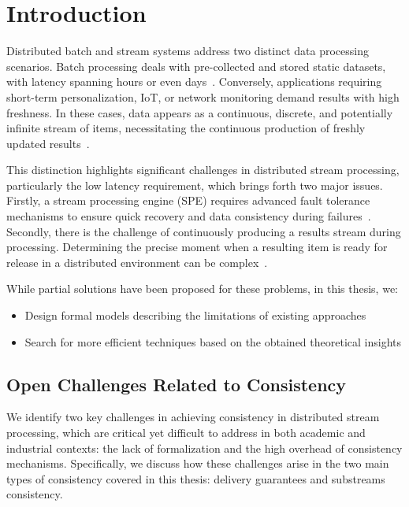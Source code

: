\chapter{Introduction}

Distributed batch and stream systems address two distinct data processing scenarios. Batch processing deals with pre-collected and stored static datasets, with latency spanning hours or even days~\cite{carbone2015apache, chang2014hawq, sun2023survey}. Conversely, applications requiring short-term personalization, IoT, or network monitoring demand results with high freshness. In these cases, data appears as a continuous, discrete, and potentially infinite stream of items, necessitating the continuous production of freshly updated results~\cite{fragkoulis2024survey, diro2024anomaly}.

This distinction highlights significant challenges in distributed stream processing, particularly the low latency requirement, which brings forth two major issues. Firstly, a stream processing engine (SPE) requires advanced fault tolerance mechanisms to ensure quick recovery and data consistency during failures~\cite{Wang:2019:LSF:3341301.3359653, akidau2015streaming}. Secondly, there is the challenge of continuously producing a results stream during processing. Determining the precise moment when a resulting item is ready for release in a distributed environment can be complex~\cite{Tucker:2003:EPS:776752.776780, DBLP:journals/pvldb/BegoliACHKKMS21}.

While partial solutions have been proposed for these problems, in this thesis, we: 
\begin{itemize}
    \item Design formal models describing the limitations of existing approaches
    \item Search for more efficient techniques based on the obtained theoretical insights
\end{itemize}

\section{Open Challenges Related to Consistency}
\label{thesis-intro-challenges}

We identify two key challenges in achieving consistency in distributed stream processing, which are critical yet difficult to address in both academic and industrial contexts: the lack of formalization and the high overhead of consistency mechanisms. Specifically, we discuss how these challenges arise in the two main types of consistency covered in this thesis: delivery guarantees and substreams consistency.

